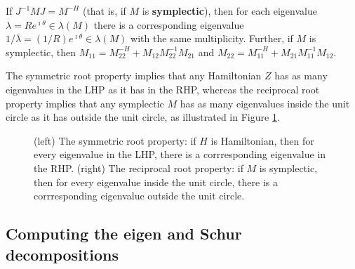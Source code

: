 \begin{fact} \label{fact.A.D.D.Ed}
If $J^{-1} M J = M^{-H}$ (that is, if $M$ is {\bf symplectic}), then for each eigenvalue $\lambda=R e^{\imath \theta}  \in \lambda(M)$
there is a corresponding eigenvalue $1/\bar\lambda = (1/R) e^{\imath \theta} \in \lambda(M)$
with the same multiplicity.  Further, if $M$ is symplectic, then $M_{11}=M_{22}^{-H}+M_{12} M_{22}^{-1} M_{21}$ and $M_{22}=M_{11}^{-H}+M_{21} M_{11}^{-1} M_{12}$.
\end{fact}

The symmetric root property implies that any Hamiltonian $Z$ has as many eigenvalues in the LHP as it has in the RHP, whereas
the reciprocal root property implies that any symplectic $M$ has as many eigenvalues inside the unit circle as it has outside the unit circle, as illustrated in Figure \ref{fig:symroot}.
\clearpage

\begin{figure}[h!]
\centerline{\qquad \qquad {}}
\caption{(left) The symmetric root property: if $H$ is Hamiltonian, then for every eigenvalue in the LHP, there is a
corrresponding eigenvalue in the RHP.
(right) The reciprocal root property: if $M$ is symplectic, then for every eigenvalue inside the unit circle, there is a
corrresponding eigenvalue outside the unit circle.}\label{fig:symroot}
\end{figure}

\subsection{Computing the eigen and Schur decompositions}\label{sec.A.D.E}

 \label{sec.A.D.E.A}

